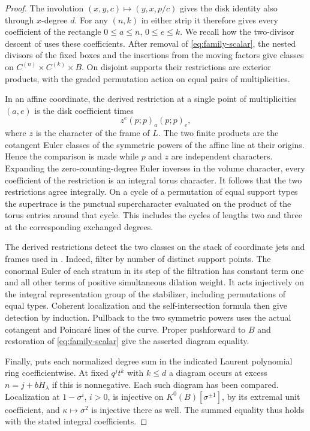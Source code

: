 \begin{proof}
The involution $(x,y,c)\mapsto(y,x,p/c)$ gives the disk identity
also through $x$-degree $d$. For any $(n,k)$ in either strip it
therefore gives every coefficient of the rectangle
$0\leq a\leq n$, $0\leq e\leq k$.
We recall how the two-divisor descent of
\cite[Proposition~7.1]{W1} uses these coefficients.
After removal of \eqref{eq:family-scalar}, the nested divisors of the
fixed boxes and the insertions from the moving factors give classes
on $C^{(n)}\times C^{(k)}\times B$. On disjoint supports their
restrictions are exterior products, with the graded permutation
action on equal pairs of multiplicities.

In an affine coordinate, the derived restriction at a single point
of multiplicities $(a,e)$ is the disk coefficient times
\[
    z^e(p;p)_a(p;p)_e ,
\]
where $z$ is the character of the frame of $L$. The two finite
products are the cotangent Euler classes of the symmetric powers
of the affine line at their origins. Hence the comparison is made
while $p$ and $z$ are independent characters. Expanding the
zero-counting-degree Euler inverses in the volume character, every
coefficient of the restriction is an integral torus character.
It follows that the two restrictions agree integrally. On a cycle
of a permutation of equal support types the supertrace is the
punctual supercharacter evaluated on the product of the torus
entries around that cycle. This includes the cycles of lengths two
and three at the corresponding exchanged degrees.

The derived restrictions detect the two classes on the stack of
coordinate jets and frames used in \cite[\S7.2]{W1}. Indeed,
filter by number of distinct support points. The conormal Euler
of each stratum in its step of the filtration has constant term
one and all other terms of positive simultaneous dilation weight.
It acts injectively on the integral representation group of the
stabilizer, including permutations of equal types. Coherent
localization and the self-intersection formula then give detection
by induction. Pullback to the two symmetric powers uses the actual
cotangent and Poincar\'e lines of the curve. Proper pushforward to
$B$ and restoration of \eqref{eq:family-scalar} give the asserted
diagram equality.

Finally, \cite[Lemma~2.2]{W1} puts each normalized degree sum in
the indicated Laurent polynomial ring coefficientwise. At fixed
$q^j t^k$ with $k\leq d$ a diagram occurs at excess
$n=j+bH_\lambda$ if this is nonnegative. Each such diagram has
been compared. Localization at $1-\sigma^i$, $i>0$, is injective
on $K^0(B)[\sigma^{\pm1}]$, by its extremal unit coefficient,
and $\kappa\mapsto\sigma^2$ is injective there as well. The
summed equality thus holds with the stated integral coefficients.
\end{proof}
